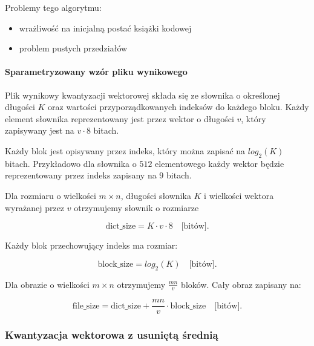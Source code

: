 \documentclass{article}
\begin{document}
Problemy tego algorytmu:

\begin{itemize}
  \item wrażliwość na inicjalną postać książki kodowej
  \item problem pustych przedziałów
\end{itemize}

\paragraph{Sparametryzowany wzór pliku wynikowego}
\label{sec:lgb_file_size}
Plik wynikowy kwantyzacji wektorowej składa się ze słownika o określonej długości $K$ oraz wartości przyporządkowanych indeksów do każdego bloku. Każdy element słownika reprezentowany jest przez wektor o długości $v$, który zapisywany jest na $v \cdot 8$ bitach.

Każdy blok jest opisywany przez indeks, który można zapisać na $log_2(K)$ bitach. Przykładowo dla słownika o $512$ elementowego każdy wektor będzie reprezentowany przez indeks zapisany na $9$ bitach.


Dla rozmiaru o wielkości $m \times n$, długości słownika $K$ i wielkości wektora wyrażanej przez $v$ otrzymujemy słownik o rozmiarze

\begin{equation}
  \textrm{dict\_size} = K \cdot v \cdot 8 \quad \textrm{[bitów]}.
  \label{eq:lgb_dict_size}
\end{equation}

Każdy blok przechowujący indeks ma rozmiar:

\begin{equation}
  \textrm{block\_size} = log_2(K)  \quad  \textrm{[bitów]}.
  \label{eq:lgb_indeks_size}
\end{equation}

Dla obrazie o wielkości $m \times n$ otrzymujemy $\frac{mn}{v}$ bloków. Cały obraz zapisany na: 

\begin{equation}
  \textrm{file\_size} = \textrm{dict\_size} + \frac{mn}{v} \cdot \textrm{block\_size}  \quad  \textrm{[bitów]}.
  \label{eq:lgb_image_size}
\end{equation}

\subsubsection{Kwantyzacja wektorowa z usuniętą średnią}
\end{document}
